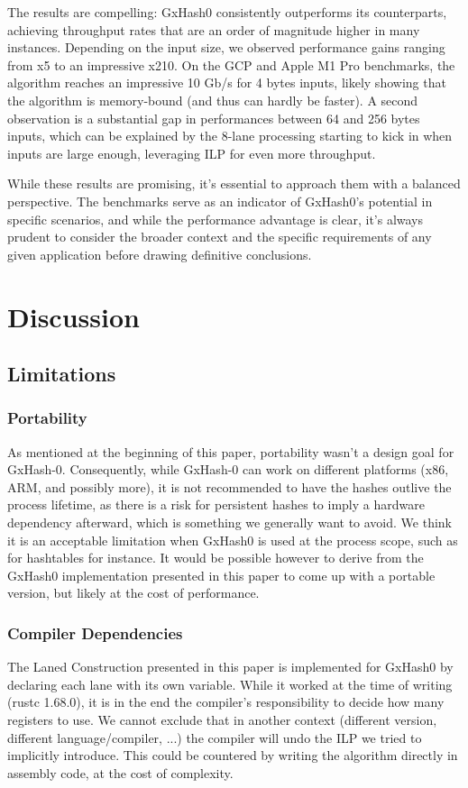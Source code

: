 \documentclass[10pt]{article}
\begin{document}
The results are compelling: GxHash0 consistently outperforms its counterparts, achieving throughput rates that are an order of magnitude higher in many instances. Depending on the input size, we observed performance gains ranging from x5 to an impressive x210. On the GCP and Apple M1 Pro benchmarks, the algorithm reaches an impressive 10 Gb/s for 4 bytes inputs, likely showing that the algorithm is memory-bound (and thus can hardly be faster). A second observation is a substantial gap in performances between 64 and 256 bytes inputs, which can be explained by the 8-lane processing starting to kick in when inputs are large enough, leveraging ILP for even more throughput.

While these results are promising, it's essential to approach them with a balanced perspective. The benchmarks serve as an indicator of GxHash0's potential in specific scenarios, and while the performance advantage is clear, it's always prudent to consider the broader context and the specific requirements of any given application before drawing definitive conclusions.

\section{Discussion}
\subsection{Limitations}

\subsubsection{Portability}
As mentioned at the beginning of this paper, portability wasn't a design goal for GxHash-0. Consequently, while GxHash-0 can work on different platforms (x86, ARM, and possibly more), it is not recommended to have the hashes outlive the process lifetime, as there is a risk for persistent hashes to imply a hardware dependency afterward, which is something we generally want to avoid. We think it is an acceptable limitation when GxHash0 is used at the process scope, such as for hashtables for instance.
It would be possible however to derive from the GxHash0 implementation presented in this paper to come up with a portable version, but likely at the cost of performance.

\subsubsection{Compiler Dependencies} 
The Laned Construction presented in this paper is implemented for GxHash0 by declaring each lane with its own variable. While it worked at the time of writing (rustc 1.68.0), it is in the end the compiler's responsibility to decide how many registers to use. We cannot exclude that in another context (different version, different language/compiler, ...) the compiler will undo the ILP we tried to implicitly introduce. This could be countered by writing the algorithm directly in assembly code, at the cost of complexity.
\end{document}
